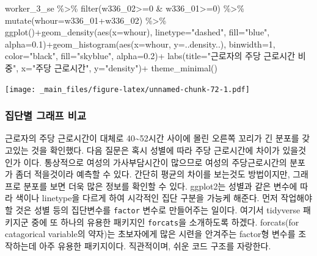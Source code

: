 \documentclass[
]{book}
\newenvironment{Shaded}{\begin{snugshade}}{\end{snugshade}}
\newcommand{\AttributeTok}[1]{\textcolor[rgb]{0.77,0.63,0.00}{#1}}
\newcommand{\DecValTok}[1]{\textcolor[rgb]{0.00,0.00,0.81}{#1}}
\newcommand{\FloatTok}[1]{\textcolor[rgb]{0.00,0.00,0.81}{#1}}
\newcommand{\FunctionTok}[1]{\textcolor[rgb]{0.00,0.00,0.00}{#1}}
\newcommand{\NormalTok}[1]{#1}
\newcommand{\SpecialCharTok}[1]{\textcolor[rgb]{0.00,0.00,0.00}{#1}}
\newcommand{\StringTok}[1]{\textcolor[rgb]{0.31,0.60,0.02}{#1}}
\theoremstyle{definition}
\theoremstyle{definition}
\theoremstyle{definition}
\theoremstyle{definition}
\theoremstyle{remark}
\begin{document}
\begin{Shaded}
\begin{Highlighting}[]
\NormalTok{worker\_3\_se }\SpecialCharTok{\%\textgreater{}\%} 
  \FunctionTok{filter}\NormalTok{(w336\_02}\SpecialCharTok{\textgreater{}=}\DecValTok{0} \SpecialCharTok{\&}\NormalTok{ w336\_01}\SpecialCharTok{\textgreater{}=}\DecValTok{0}\NormalTok{) }\SpecialCharTok{\%\textgreater{}\%} 
  \FunctionTok{mutate}\NormalTok{(}\AttributeTok{whour=}\NormalTok{w336\_01}\SpecialCharTok{+}\NormalTok{w336\_02) }\SpecialCharTok{\%\textgreater{}\%} 
  \FunctionTok{ggplot}\NormalTok{()}\SpecialCharTok{+}\FunctionTok{geom\_density}\NormalTok{(}\FunctionTok{aes}\NormalTok{(}\AttributeTok{x=}\NormalTok{whour), }\AttributeTok{linetype=}\StringTok{"dashed"}\NormalTok{, }\AttributeTok{fill=}\StringTok{"blue"}\NormalTok{, }\AttributeTok{alpha=}\FloatTok{0.1}\NormalTok{)}\SpecialCharTok{+}\FunctionTok{geom\_histogram}\NormalTok{(}\FunctionTok{aes}\NormalTok{(}\AttributeTok{x=}\NormalTok{whour, }\AttributeTok{y=}\NormalTok{..density..), }\AttributeTok{binwidth=}\DecValTok{1}\NormalTok{, }\AttributeTok{color=}\StringTok{"black"}\NormalTok{, }\AttributeTok{fill=}\StringTok{"skyblue"}\NormalTok{, }\AttributeTok{alpha=}\FloatTok{0.2}\NormalTok{)}\SpecialCharTok{+}
  \FunctionTok{labs}\NormalTok{(}\AttributeTok{title=}\StringTok{"근로자의 주당 근로시간 비중"}\NormalTok{, }\AttributeTok{x=}\StringTok{"주당 근로시간"}\NormalTok{, }\AttributeTok{y=}\StringTok{"density"}\NormalTok{)}\SpecialCharTok{+}
  \FunctionTok{theme\_minimal}\NormalTok{()}
\end{Highlighting}
\end{Shaded}

\texttt{[image: \_main\_files/figure-latex/unnamed-chunk-72-1.pdf]}

\hypertarget{uxc9d1uxb2e8uxbcc4-uxadf8uxb798uxd504-uxbe44uxad50}{%
\subsubsection{집단별 그래프 비교}\label{uxc9d1uxb2e8uxbcc4-uxadf8uxb798uxd504-uxbe44uxad50}}

근로자의 주당 근로시간이 대체로 40\textasciitilde52시간 사이에 몰린 오른쪽 꼬리가 긴 분포를 갖고있는 것을 확인했다. 다음 질문은 혹시 성별에 따라 주당 근로시간에 차이가 있을것인가 이다. 통상적으로 여성의 가사부담시간이 많으므로 여성의 주당근로시간의 분포가 좀더 적을것이라 예측할 수 있다. 간단히 평균의 차이를 보는것도 방법이지만, 그래프로 분포를 보면 더욱 많은 정보를 확인할 수 있다.
ggplot2는 성별과 같은 변수에 따라 색이나 linetype을 다르게 하여 시각적인 집단 구분을 가능케 해준다. 먼저 작업해야 할 것은 성별 등의 집단변수를 \texttt{factor} 변수로 만들어주는 일이다. 여기서 tidyverse 패키지군 중에 또 하나의 유용한 패키지인 \texttt{forcats}을 소개하도록 하겠다. forcats(for catagorical variable의 약자)는 초보자에게 많은 시련을 안겨주는 factor형 변수를 조작하는데 아주 유용한 패키지이다. 직관적이며, 쉬운 코드 구조를 자랑한다.
\end{document}
